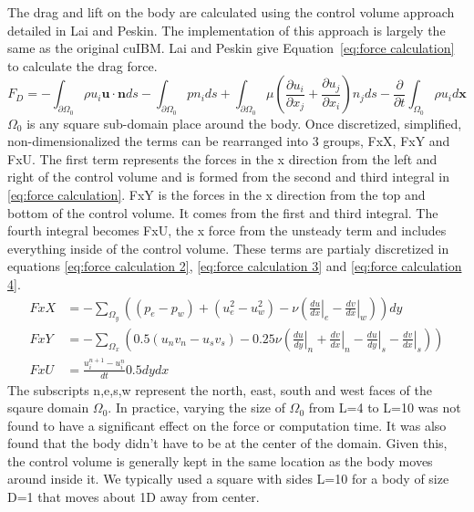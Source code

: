 \documentclass[onehalf,11pt]{beavtex}
\begin{document}
The drag and lift on the body are calculated using the control volume approach detailed in Lai and Peskin\cite{lai2000immersed}.
The implementation of this approach is largely the same as the original cuIBM. 
Lai and Peskin give Equation~\eqref{eq:force calculation} to calculate the drag force. 
\begin{equation}\label{eq:force calculation}
F_D=-\int_{\partial \Omega_0} \rho u_i\textbf{u}\cdot \textbf{n}ds- \int_{\partial \Omega_0}pn_ids+\int_{\partial \Omega_0}\mu \left(\frac{\partial u_i}{\partial x_j}+\frac{\partial u_j}{\partial x_i}\right)n_jds-\frac{\partial}{\partial t}\int_{\Omega_0}\rho u_i d\textbf{x}
\end{equation}
$\Omega_0$ is any square sub-domain place around the body. 
Once discretized, simplified, non-dimensionalized the terms can be rearranged into 3 groups, FxX, FxY and FxU. 
The first term represents the forces in the x direction from the left and right of the control volume and is formed from the second and third integral in \eqref{eq:force calculation}. 
FxY is the forces in the x direction from the top and bottom of the control volume.
It comes from the first and third integral. 
The fourth integral becomes FxU, the x force from the unsteady term and includes everything inside of the control volume. 
These terms are partialy discretized in equations \eqref{eq:force calculation 2}, \eqref{eq:force calculation 3} and \eqref{eq:force calculation 4}. 
\begin{align}
FxX &=-\sum_{\Omega_y}\left((p_e-p_w)+(u_e^2-u_w^2)-\nu\left(\left.\frac{du}{dx}\right|_e-\left.\frac{dv}{dx}\right|_w\right)\right)dy\label{eq:force calculation 2}\\
FxY &=-\sum_{\Omega_x}\left(0.5(u_nv_n-u_sv_s)-0.25\nu \left(\left.\frac{du}{dy}\right|_n+\left.\frac{dv}{dx}\right|_n-\left.\frac{du}{dy}\right|_s-\left.\frac{dv}{dx}\right|_s\right)\right)\label{eq:force calculation 3}\\
FxU &=\frac{u_i^{n+1}-u_i^{n}}{dt}0.5dydx\;\label{eq:force calculation 4}
\end{align}
The subscripts n,e,s,w represent the north, east, south and west faces of the sqaure domain $\Omega_0$.
In practice, varying the size of $\Omega_0$ from L=4 to L=10 was not found to have a significant effect on the force or computation time.
It was also found that the body didn't have to be at the center of the domain.
Given this, the control volume is generally kept in the same location as the body moves around inside it.
We typically used a square with sides L=10 for a body of size D=1 that moves about 1D away from center.
\end{document}
